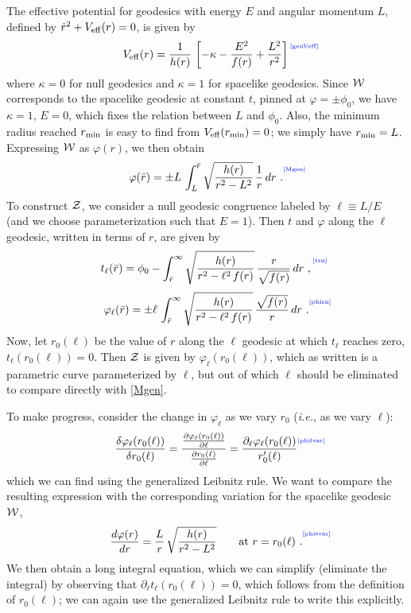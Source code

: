 \documentclass[12pt]{article}
\def\[{\left [}
\def\]{\right ]}
\def\ie{{\it i.e.}}
\def\d{\delta}
\def\ph{\varphi}
\def\p{\partial}
\def\l{\ell}
\def\CW{{\cal W}}
\def\CZ{{\cal Z}}
\def\l{\ell}
\def\p{\partial}
\def\p{\partial}
\def\Label#1{\label{#1}%
{ \color{blue}{\smash{\hbox to0pt{\raise2ex\hbox{\tiny[#1]}\hss}}}}}
\def\Gms{\CW}
\def\Cms{\CZ}
\def\pho{\phi_0}
\def\rmin{r_{\rm min}}
\def\rd{{\dot r}}
\def\rb{{\bar r}}
\def\ro{r_0}
\def\Veff{V_{\rm eff}}
\begin{document}
The effective potential for geodesics with energy $E$ and angular momentum $L$, defined by
$\rd^2 + \Veff(r) = 0$, is given by
%
\begin{equation}
\Veff(r) = { 1 \over h(r)} \, \[ -\kappa - {E^2 \over f(r)} + {L^2 \over r^2} \]
\Label{genVeff}
\end{equation}
%
where $\kappa=0$ for null geodesics and $\kappa=1$ for spacelike geodesics.
Since $\Gms $ corresponds to the spacelike
geodesic at constant $t$, pinned at $\ph = \pm \pho$, we have
 $\kappa=1$, $E=0$, which fixes the relation
  between $L$ and $\pho$.  Also, the minimum radius
   reached $\rmin$ is easy to find from $\Veff(\rmin)=0$;  we simply have $\rmin = L$.
Expressing $\Gms $  as $\ph(r)$, we then obtain
%
\begin{equation}
\ph(\rb) = \pm L \, \int_L^{\rb} \sqrt{{h(r) \over r^2 - L^2}} \, {1 \over r} \, dr \ .
\Label{Mgen}
\end{equation}
%
To construct $\Cms $,
we consider a null geodesic
 congruence labeled by $\l \equiv L/E$ (and we choose parameterization such that $E=1$).  Then $t$ and $\ph$ along the $\l$ geodesic, written in terms of $r$, are given by
%
\begin{equation}
t_{\l}(\rb) = \pho -  \int_{\rb}^{\infty}
  \sqrt{{h(r)  \over r^2 - \l^2 \, f(r) }} \, {r \over \sqrt{f(r)}} \, dr \ ,
\Label{trn}
\end{equation}
%
%
\begin{equation}
\ph_{\l}(\rb) = \pm \l \, \int_{\rb}^{\infty}
  \sqrt{{h(r)  \over r^2 - \l^2 \, f(r) }} \, {\sqrt{f(r)} \over r} \, dr \ .
\Label{phirn}
\end{equation}
%
Now, let $\ro(\l)$ be the value of $r$ along the $\l$ geodesic at which $t_{\l}$ reaches zero, $t_{\l}(\ro(\l)) = 0$.  Then $\Cms $ is given by $\ph_{\l}(\ro(\l))$, which as written is a parametric curve parameterized by $\l$, but out of which $\l$ should be eliminated to compare directly with \ref{Mgen}.

To make progress, consider the change in $\ph_{\l}$ as we vary $\ro$ (\ie, as we vary $\l$):
%
\begin{equation}
{\d \ph_{\l}(\ro(\l)) \over \d \ro(\l)} =
{{\p \ph_{\l}(\ro(\l)) \over \p \l } \over {\p \ro(\l) \over \p \l}}
= {\p_{\l} \ph_{\l}(\ro(\l)) \over \ro'(\l) }
\Label{philvar}
\end{equation}
%
which we can find using the generalized Leibnitz rule.  We want to compare the resulting expression with the corresponding variation for the spacelike geodesic $\Gms $,
%
\begin{equation}
{d \ph(r) \over dr} = {L \over r} \, \sqrt{{h(r) \over r^2 - L^2}}
\qquad {\rm at} \ r = \ro(\l) \ .
  \Label{phisvar}
  \end{equation}
%
We then obtain a long integral equation, which we can simplify (eliminate the integral) by observing that $\p_{\l} t_{\l}(\ro(\l)) = 0$, which follows from the definition of $\ro(\l)$; we can again use the generalized Leibnitz rule to write this explicitly.
\end{document}
